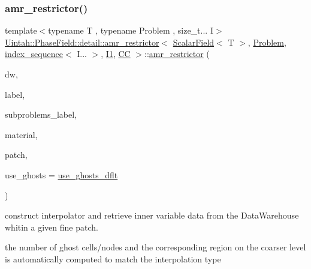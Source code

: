 \subsubsection{\texorpdfstring{amr\+\_\+restrictor()}{amr\_restrictor()}\hspace{0.1cm}{\footnotesize\ttfamily [3/4]}}
{\footnotesize\ttfamily template$<$typename T , typename Problem , size\+\_\+t... I$>$ \\
\hyperlink{classUintah_1_1PhaseField_1_1detail_1_1amr__restrictor}{Uintah\+::\+Phase\+Field\+::detail\+::amr\+\_\+restrictor}$<$ \hyperlink{structUintah_1_1PhaseField_1_1ScalarField}{Scalar\+Field}$<$ T $>$, \hyperlink{classUintah_1_1PhaseField_1_1Problem}{Problem}, \hyperlink{namespaceUintah_1_1PhaseField_a237de804d99512e50613aff7c94a9461}{index\+\_\+sequence}$<$ I... $>$, \hyperlink{namespaceUintah_1_1PhaseField_a547ce3002aa97fbd3ef3192a6eec8406a66f19efe774b0d2b6e5844eb2d83d305}{I1}, \hyperlink{namespaceUintah_1_1PhaseField_a33d355affda78a83f45755ba8388cedda22303704507d024d1d6508ed9859a85a}{CC} $>$\+::\hyperlink{classUintah_1_1PhaseField_1_1detail_1_1amr__restrictor}{amr\+\_\+restrictor} (\begin{DoxyParamCaption}\item[{Data\+Warehouse $\ast$}]{dw,  }\item[{const Var\+Label $\ast$}]{label,  }\item[{const Var\+Label $\ast$}]{subproblems\+\_\+label,  }\item[{int}]{material,  }\item[{const Patch $\ast$}]{patch,  }\item[{bool}]{use\+\_\+ghosts = {\ttfamily \hyperlink{classUintah_1_1PhaseField_1_1detail_1_1amr__restrictor_3_01ScalarField_3_01T_01_4_00_01Problem_0778720acc9a55f696b8537356a4dbcae_a4cae73002d40229c69caae07718b94d4}{use\+\_\+ghosts\+\_\+dflt}} }\end{DoxyParamCaption})\hspace{0.3cm}{\ttfamily [inline]}}



construct interpolator and retrieve inner variable data from the Data\+Warehouse whitin a given fine patch. 

the number of ghost cells/nodes and the corresponding region on the coarser level is automatically computed to match the interpolation type



